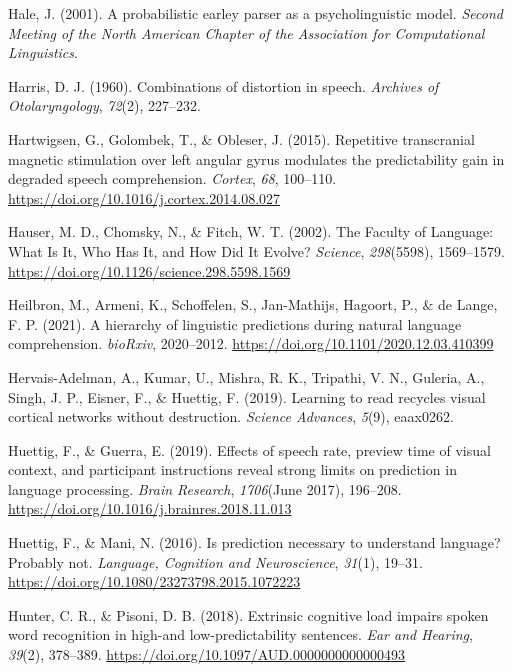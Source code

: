 \documentclass[a4paper, nobind]{templates/ociamthesis}
\newlength{\cslhangindent}
\newenvironment{CSLReferences}[2] %
 {%
  \setlength{\parindent}{0pt}
  \ifodd #1
  \let\oldpar\par
  \def\par{\hangindent=\cslhangindent\oldpar}
  \fi
  \setlength{\parskip}{1mm}
  \setlength{\baselineskip}{6mm}
 }%
 {}
\begin{document}
\begin{CSLReferences}{1}{0}
\leavevmode{}%
Hale, J. (2001). A probabilistic earley parser as a psycholinguistic model. \emph{Second Meeting of the North American Chapter of the Association for Computational Linguistics}.

\leavevmode{}%
Harris, D. J. (1960). {Combinations of distortion in speech}. \emph{Archives of Otolaryngology}, \emph{72}(2), 227--232.

\leavevmode{}%
Hartwigsen, G., Golombek, T., \& Obleser, J. (2015). Repetitive transcranial magnetic stimulation over left angular gyrus modulates the predictability gain in degraded speech comprehension. \emph{Cortex}, \emph{68}, 100--110. \url{https://doi.org/10.1016/j.cortex.2014.08.027}

\leavevmode{}%
Hauser, M. D., Chomsky, N., \& Fitch, W. T. (2002). The Faculty of Language: What Is It, Who Has It, and How Did It Evolve? \emph{Science}, \emph{298}(5598), 1569--1579. \url{https://doi.org/10.1126/science.298.5598.1569}

\leavevmode{}%
Heilbron, M., Armeni, K., Schoffelen, S., Jan-Mathijs, Hagoort, P., \& de Lange, F. P. (2021). {A hierarchy of linguistic predictions during natural language comprehension}. \emph{bioRxiv}, 2020--2012. \url{https://doi.org/10.1101/2020.12.03.410399}

\leavevmode{}%
Hervais-Adelman, A., Kumar, U., Mishra, R. K., Tripathi, V. N., Guleria, A., Singh, J. P., Eisner, F., \& Huettig, F. (2019). Learning to read recycles visual cortical networks without destruction. \emph{Science Advances}, \emph{5}(9), eaax0262.

\leavevmode{}%
Huettig, F., \& Guerra, E. (2019). {Effects of speech rate, preview time of visual context, and participant instructions reveal strong limits on prediction in language processing}. \emph{Brain Research}, \emph{1706}(June 2017), 196--208. \url{https://doi.org/10.1016/j.brainres.2018.11.013}

\leavevmode{}%
Huettig, F., \& Mani, N. (2016). Is prediction necessary to understand language? Probably not. \emph{Language, Cognition and Neuroscience}, \emph{31}(1), 19--31. \url{https://doi.org/10.1080/23273798.2015.1072223}

\leavevmode{}%
Hunter, C. R., \& Pisoni, D. B. (2018). {Extrinsic cognitive load impairs spoken word recognition in high-and low-predictability sentences}. \emph{Ear and Hearing}, \emph{39}(2), 378--389. \url{https://doi.org/10.1097/AUD.0000000000000493}


\end{CSLReferences}
\end{document}
